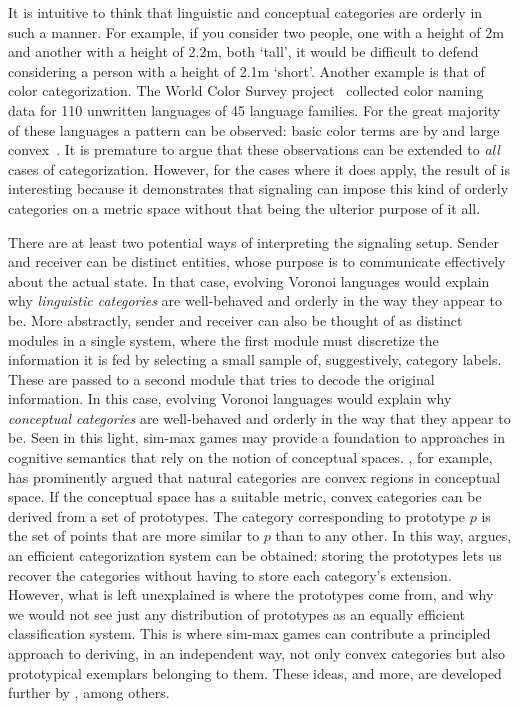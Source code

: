 \documentclass[fleqn,reqno,10pt]{article}
\begin{document}
It is intuitive to think that linguistic and conceptual categories are orderly in such a manner.
For example, if you consider two people, one with a height of 2m and another with a height of 2.2m, both `tall', it would be difficult to defend considering a person with a height of 2.1m `short'.
Another example is that of color categorization.
The World Color Survey project~\citep{WCS} collected color naming data for 110 unwritten languages of 45 language families.
For the great majority of these languages a pattern can be observed: basic color terms are by and large convex~\citep{Regier07,Jager2010}.
It is premature to argue that these observations can be extended to \emph{all} cases of categorization.
However, for the cases where it does apply, the result of \citet{JagerMetzger2011:Voronoi-Languag} is interesting because it demonstrates that signaling can impose this kind of orderly categories on a metric space without that being the ulterior purpose of it all.

There are at least two potential ways of interpreting the signaling setup.
Sender and receiver can be distinct
entities, whose purpose is to communicate effectively about the actual
state. In that case, evolving Voronoi languages would explain why
\emph{linguistic categories} are well-behaved and orderly in the way
they appear to be. More abstractly, sender and receiver can also be
thought of as distinct modules in a single system, where the first
module must discretize the information it is fed by selecting a small
sample of, suggestively, category labels. These are passed to a second
module that tries to decode the original information. In this case,
evolving Voronoi languages would explain why \emph{conceptual
  categories} are well-behaved and orderly in the way that they appear
to be.
Seen in this light, sim-max games may provide a foundation to approaches in cognitive semantics
that rely on the notion of conceptual spaces.
\citet[][70--77]{Gardenfors2000:Conceptual-Spac}, for example, has prominently argued that
natural categories are convex regions in conceptual space. If the conceptual space has a
suitable metric, convex categories can be derived from a set of prototypes. The category
corresponding to prototype $p$ is the set of points that are more similar to $p$ than to any
other. In this way, \citeauthor{Gardenfors2000:Conceptual-Spac} argues, an efficient categorization
system can be obtained: storing the prototypes lets us recover the categories without having to
store each category's extension. However, what is left unexplained is where the prototypes
come from, and why we would not see just any distribution of prototypes as an equally efficient
classification system. This is where sim-max games can contribute a principled approach to
deriving, in an independent way, not only convex categories but also prototypical exemplars
belonging to them.  These ideas, and more, are developed further by
\citet{Jager2007:The-Evolution-o,JagerRooijvan-Rooij2007:Language-Struct,JagerMetzger2011:Voronoi-Languag,OConnor2014-OCOEPC},
among others.
\end{document}

